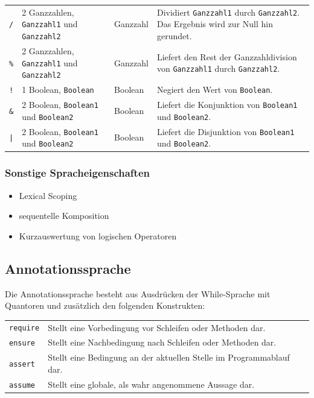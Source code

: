 \documentclass[a4paper,10pt]{article}
\begin{document}
\begin{tabularx}{\textwidth}{| l | X | l | X |}
\texttt{/} & 2 Ganzzahlen, \texttt{Ganzzahl1} und \texttt{Ganzzahl2} & Ganzzahl & Dividiert \texttt{Ganzzahl1} durch \texttt{Ganzzahl2}. Das Ergebnis wird zur Null hin gerundet.\\
\texttt{\%} & 2 Ganzzahlen, \texttt{Ganzzahl1} und \texttt{Ganzzahl2} & Ganzzahl & Liefert den Rest der Ganzzahldivision von \texttt{Ganzzahl1} durch \texttt{Ganzzahl2}.\\
\hline
\texttt{!} & 1 Boolean, \texttt{Boolean} & Boolean & Negiert den Wert von \texttt{Boolean}.\\
\texttt{\&} & 2 Boolean, \texttt{Boolean1} und \texttt{Boolean2} & Boolean & Liefert die Konjunktion von \texttt{Boolean1} und \texttt{Boolean2}.\\
\texttt{|} & 2 Boolean, \texttt{Boolean1} und \texttt{Boolean2} & Boolean & Liefert die Disjunktion von \texttt{Boolean1} und \texttt{Boolean2}.\\
\hline
\end{tabularx}
\subsubsection{Sonstige Spracheigenschaften}
\begin{itemize}
  \item Lexical Scoping
  \item sequentelle Komposition
  \item Kurzauswertung von logischen Operatoren
\end{itemize}

\subsection{Annotationssprache}
Die Annotationssprache besteht aus Ausdrücken der While-Sprache mit Quantoren und zusätzlich den folgenden Konstrukten:\\
\begin{tabularx}{\textwidth}{| l | X |}
\hline
\texttt{require} & Stellt eine Vorbedingung vor Schleifen oder Methoden dar.\\
\texttt{ensure} & Stellt eine Nachbedingung nach Schleifen oder Methoden dar.\\
\texttt{assert} & Stellt eine Bedingung an der aktuellen Stelle im Programmablauf dar.\\
\texttt{assume} & Stellt eine globale, als wahr angenommene Aussage dar.\\
\hline
\end{tabularx}
\end{document}
